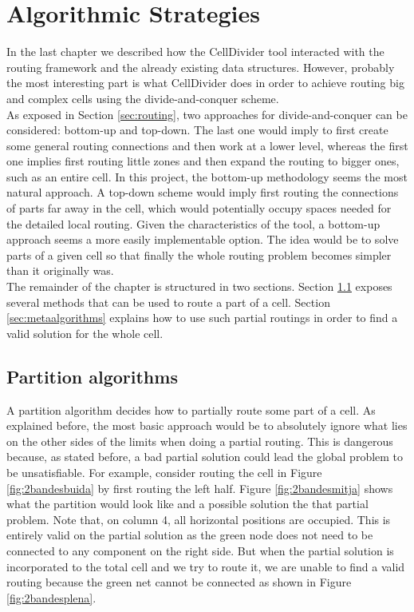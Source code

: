 \chapter{Algorithmic Strategies}
\label{cha:partition_strategy}

In the last chapter we described how the CellDivider tool interacted with the routing framework and the already existing data structures. However, probably the most interesting part is what CellDivider does in order to achieve routing big and complex cells using the divide-and-conquer scheme. \\

As exposed in Section \ref{sec:routing}, two approaches for divide-and-conquer can be considered: bottom-up and top-down. The last one would imply to first create some general routing connections and then work at a lower level, whereas the first one implies first routing little zones and then expand the routing to bigger ones, such as an entire cell. In this project, the bottom-up methodology seems the most natural approach. A top-down scheme would imply first routing the connections of parts far away in the cell, which would potentially occupy spaces needed for the detailed local routing. Given the characteristics of the tool, a bottom-up approach seems a more easily implementable option. The idea would be to solve parts of a given cell so that finally the whole routing problem becomes simpler than it originally was.  \\

The remainder of the chapter is structured in two sections. Section \ref{sec:partitionalgorithms} exposes several methods that can be used to route a part of a cell. Section \ref{sec:metaalgorithms} explains how to use such partial routings in order to find a valid solution for the whole cell.

\section{Partition algorithms}
\label{sec:partitionalgorithms}

A partition algorithm decides how to partially route some part of a cell. As explained before, the most basic approach would be to absolutely ignore what lies on the other sides of the limits when doing a partial routing. This is dangerous because, as stated before, a bad partial solution could lead the global problem to be unsatisfiable. For example, consider routing the cell in Figure \ref{fig:2bandesbuida} by first routing the left half. Figure \ref{fig:2bandesmitja} shows what the partition would look like and a possible solution the that partial problem. Note that, on column 4, all horizontal positions are occupied. This is entirely valid on the partial solution as the green node does not need to be connected to any component on the right side. But when the partial solution is incorporated to the total cell and we try to route it, we are unable to find a valid routing because the green net cannot be connected as shown in Figure \ref{fig:2bandesplena}. \\

